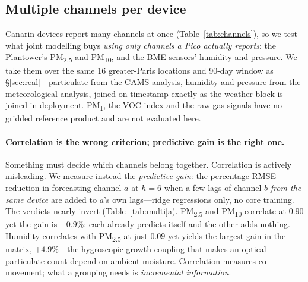 \documentclass[10pt]{article}
\begin{document}
\subsection{Multiple channels per device}
\label{sec:multi}
Canarin devices report many channels at once (Table~\ref{tab:channels}), so we test
what joint modelling buys \emph{using only channels a Pico actually reports}: the
Plantower's PM\textsubscript{2.5} and PM\textsubscript{10}, and the BME sensors'
humidity and pressure. We take them over the same 16 greater-Paris locations and
90-day window as \S\ref{sec:real}---particulate from the CAMS analysis, humidity and
pressure from the meteorological analysis, joined on timestamp exactly as the
weather block is joined in deployment. PM\textsubscript{1}, the VOC index and the
raw gas signals have no gridded reference product and are not evaluated here.

\paragraph{Correlation is the wrong criterion; predictive gain is the right one.}
Something must decide which channels belong together. Correlation is actively
misleading. We measure instead the \emph{predictive gain}: the percentage RMSE
reduction in forecasting channel $a$ at $h=6$ when a few lags of channel $b$
\emph{from the same device} are added to $a$'s own lags---ridge regressions only,
no core training. The verdicts nearly invert (Table~\ref{tab:multi}a).
PM\textsubscript{2.5} and PM\textsubscript{10} correlate at $0.90$ yet the gain is
$-0.9\%$: each already predicts itself and the other adds nothing. Humidity
correlates with PM\textsubscript{2.5} at just $0.09$ yet yields the largest gain in
the matrix, $+4.9\%$---the hygroscopic-growth coupling that makes an optical
particulate count depend on ambient moisture. Correlation measures co-movement;
what a grouping needs is \emph{incremental information}.
\end{document}
